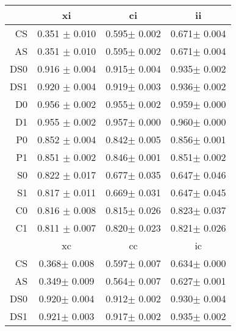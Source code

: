\begin{table}
\centering
\begin{tabular}{||r|c|c|c||}
\hline\hline
	&	xi	&	       ci                      	&	       ii	\\\hline
CS      	&	0.351 $\pm$  0.010 	&	          0.595$\pm$      0.002	&	       0.671$\pm$   0.004	\\\hline
AS      	&	0.351 $\pm$  0.010 	&	          0.595$\pm$      0.002	&	       0.671$\pm$   0.004	\\\hline
DS0     	&	0.916 $\pm$ 0.004 	&	          0.915$\pm$      0.004	&	       0.935$\pm$   0.002	\\\hline
DS1     	&	0.920 $\pm$ 0.004 	&	          0.919$\pm$      0.003	&	       0.936$\pm$   0.002	\\\hline
D0      	&	0.956 $\pm$ 0.002 	&	          0.955$\pm$      0.002	&	       0.959$\pm$   0.000	\\\hline
D1      	&	0.955 $\pm$ 0.002 	&	          0.957$\pm$      0.000	&	       0.960$\pm$   0.000	\\\hline
P0      	&	0.852 $\pm$ 0.004 	&	          0.842$\pm$      0.005	&	       0.856$\pm$   0.001	\\\hline
P1      	&	0.851 $\pm$ 0.002 	&	          0.846$\pm$      0.001	&	       0.851$\pm$   0.002	\\\hline
S0      	&	0.822 $\pm$ 0.017 	&	          0.677$\pm$      0.035	&	       0.647$\pm$   0.046	\\\hline
S1      	&	0.817 $\pm$ 0.011 	&	          0.669$\pm$      0.031	&	       0.647$\pm$   0.045	\\\hline
C0      	&	0.816 $\pm$ 0.008 	&	          0.815$\pm$      0.026	&	       0.823$\pm$   0.037	\\\hline
C1      	&	0.811 $\pm$ 0.007 	&	          0.820$\pm$      0.023	&	       0.821$\pm$   0.026	\\\hline
\hline\hline\hline							
	&	       xc              	&	       cc              	&	       ic              	\\\hline
CS      	&	       0.368$\pm$   0.008	&	       0.597$\pm$   0.007	&	       0.634$\pm$ 0.000	\\\hline
AS      	&	       0.349$\pm$  0.009	&	       0.564$\pm$ 0.007		&	       0.627$\pm$ 0.001		\\\hline
DS0     	&	       0.920$\pm$   0.004	&	       0.912$\pm$   0.002	&	       0.930$\pm$   0.004	\\\hline
DS1     	&	       0.921$\pm$   0.003	&	       0.917$\pm$   0.002	&	       0.935$\pm$   0.002	\\\hline

\end{tabular}
\end{table}
